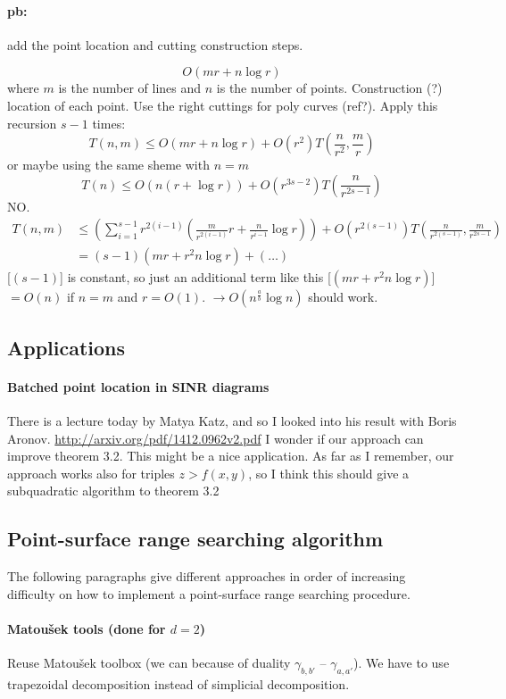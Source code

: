 \paragraph{pb:} add the point location and cutting construction steps.

$$
O(mr + n \log r)
$$
where \(m\) is the number of lines and $n$ is the number of points.
Construction (?) location of each point. Use the right cuttings for poly curves
(ref?). Apply this recursion $s-1$ times:
$$
T(n,m) \le O(mr+n \log r) + O(r^2) T(\frac{n}{r^2},\frac{m}{r})
$$
or maybe using the same sheme with $n=m$
$$
T(n) \le O(n(r + \log r)) + O(r^{3s-2}) T(\frac{n}{r^{2s-1}})
$$
NO.
\begin{align*}
	T(n,m) &\le (\sum_{i=1}^{s-1} r^{2(i-1)}
	(\frac{m}{r^{2(i-1)}}r+\frac{n}{r^{i-1}} \log
	r)) + O(r^{2(s-1)}) T(\frac{n}{r^{2(s-1)}},\frac{m}{r^{2s-1}})\\
	&= (s-1)(mr + r^2 n \log r) + (\ldots)
\end{align*}
[$(s-1)$] is constant, so just an additional term like this [$(mr + r^2 n
\log r)$] $= O(n)$ if $n=m$ and $r=O(1)$.
$\to O(n^{\frac{a}{b}} \log n)$ should work.

\subsection{Applications}
\paragraph{Batched point location in SINR diagrams} There is a lecture today
by Matya Katz, and so I looked into his result with Boris Aronov.
\url{http://arxiv.org/pdf/1412.0962v2.pdf} I wonder if our approach can improve
theorem 3.2. This might be a nice application. As far as I remember, our
approach works also for triples $z>f(x,y)$, so I think this should give a
subquadratic algorithm to theorem 3.2

\subsection{Point-surface range searching algorithm}
The following paragraphs give different approaches in order of increasing
difficulty on how to implement a point-surface range searching procedure.

\paragraph{Matou\v{s}ek tools (done for $d=2$)}
Reuse Matou\v{s}ek toolbox (we can because of duality $\gamma_{b,b'}$ --
$\gamma_{a,a'}$).
We have to use trapezoidal decomposition instead of simplicial decomposition.


